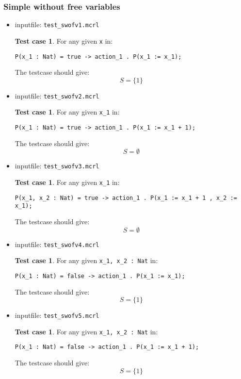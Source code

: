 \documentclass[a4paper,10pt]{article}
\theoremstyle{plain}
\theoremstyle{definition}
\newtheorem{tcase}[thmfs]{Test case}
\begin{document}
\subsubsection{Simple without free variables}
\begin{itemize}

\item inputfile: \verb"test_swofv1.mcrl" 
\begin{tcase}
For any given \verb"x" in:
\begin{verbatim}
P(x_1 : Nat) = true -> action_1 . P(x_1 := x_1);
\end{verbatim}
The testcase should give:
$$ S = \lbrace 1 \rbrace $$
\end{tcase}

\item inputfile: \verb"test_swofv2.mcrl" 
\begin{tcase} 
For any given \verb"x_1" in:
\begin{verbatim}
P(x_1 : Nat) = true -> action_1 . P(x_1 := x_1 + 1);
\end{verbatim}
The testcase should give:
$$ S = \emptyset $$
\end{tcase}

\item inputfile: \verb"test_swofv3.mcrl" 
\begin{tcase}
For any given \verb"x_1" in:
\begin{verbatim}
P(x_1, x_2 : Nat) = true -> action_1 . P(x_1 := x_1 + 1 , x_2 := x_1);
\end{verbatim}
The testcase should give:
$$ S = \emptyset $$
\end{tcase}

\item inputfile: \verb"test_swofv4.mcrl" 
\begin{tcase}
For any given \verb"x_1, x_2 : Nat" in:
\begin{verbatim}
P(x_1 : Nat) = false -> action_1 . P(x_1 := x_1);
\end{verbatim}
The testcase should give:
$$ S = \lbrace 1 \rbrace $$
\end{tcase}

\item inputfile: \verb"test_swofv5.mcrl" 
\begin{tcase}
For any given \verb"x_1, x_2 : Nat" in:
\begin{verbatim}
P(x_1 : Nat) = false -> action_1 . P(x_1 := x_1 + 1);
\end{verbatim}
The testcase should give:
$$ S = \lbrace 1 \rbrace  $$
\end{tcase}


\end{itemize}
\end{document}
